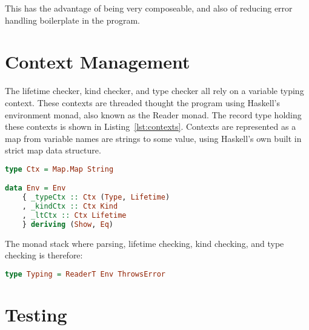 This has the advantage of being very composeable, and also of reducing error
handling boilerplate in the program.

\section{Context Management}
The lifetime checker, kind checker, and type checker all rely on a variable
typing context. These contexts are threaded thought the program using Haskell's
environment monad, also known as the Reader monad. The record type holding these
contexts is shown in Listing~\ref{lst:contexts}. Contexts are represented as a
map from variable names are strings to some value, using Haskell's own built
in strict map data structure.

\begin{lstlisting}[caption=Record data type showing contexts., language=Haskell, label={lst:contexts}]
type Ctx = Map.Map String

data Env = Env
    { _typeCtx :: Ctx (Type, Lifetime)
    , _kindCtx :: Ctx Kind
    , _ltCtx :: Ctx Lifetime
    } deriving (Show, Eq)
\end{lstlisting}

The monad stack where parsing, lifetime checking, kind checking, and type checking
is therefore:

\begin{lstlisting}[caption=Envirnment and error monad stack., language=Haskell, label={lst:monads}]
type Typing = ReaderT Env ThrowsError
\end{lstlisting}

\section{Testing}
